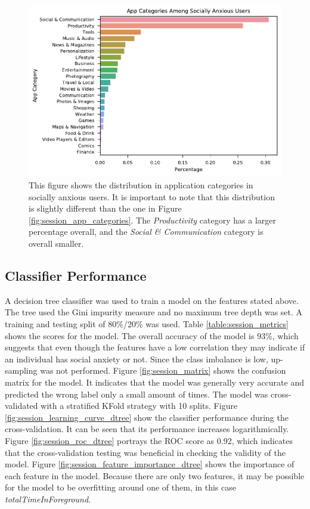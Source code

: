 \documentclass{l4proj}
\begin{document}
\begin{figure}[htb]
    \centering
    \includegraphics[width=\linewidth]{images/sessions/categories_among_anxious.pdf}
    \caption{This figure shows the distribution in application categories in socially anxious users. It is important to note that this distribution is slightly different than the one in Figure \ref{fig:session_app_categories}. The \textit{Productivity} category has a larger percentage overall, and the \textit{Social \& Communication} category is overall smaller.}
    \label{fig:categories_among_anxious} 
\end{figure}



\subsection{Classifier Performance}
A decision tree classifier was used to train a model on the features stated above. The tree used the Gini impurity measure and no maximum tree depth was set. A training and testing split of 80\%/20\% was used. Table \ref{table:session_metrics} shows the scores for the model. The overall accuracy of the model is \num{93}\%, which suggests that even though the features have a low correlation they may indicate if an individual has social anxiety or not. Since the class imbalance is low, up-sampling was not performed. Figure \ref{fig:session_matrix} shows the confusion matrix for the model. It indicates that the model was generally very accurate and predicted the wrong label only a small amount of times. The model was cross-validated with a stratified KFold strategy with 10 splits. Figure \ref{fig:session_learning_curve_dtree} show the classifier performance during the cross-validation. It can be seen that its performance increases logarithmically. Figure \ref{fig:session_roc_dtree} portrays the ROC score as 0.92, which indicates that the cross-validation testing was beneficial in checking the validity of the model. Figure \ref{fig:session_feature_importance_dtree} shows the importance of each feature in the model. Because there are only two features, it may be possible for the model to be overfitting around one of them, in this case \textit{totalTimeInForeground}.
\end{document}
